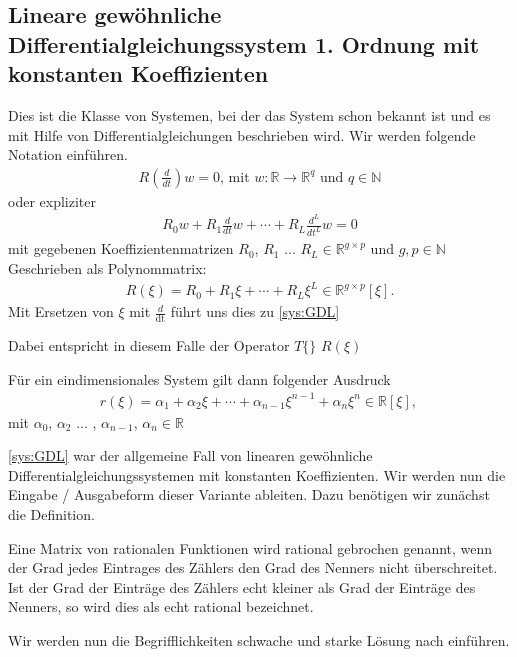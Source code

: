 \subsection{Lineare gewöhnliche Differentialgleichungssystem 1. Ordnung mit konstanten Koeffizienten}\label{sys:diff}
Dies ist die Klasse von Systemen, bei der das System schon bekannt ist und es mit Hilfe von Differentialgleichungen beschrieben wird. Wir werden folgende Notation einführen. 
\begin{align}
	R(\frac{d}{dt}) w = 0 \label{sys:GDL} \text{, mit } w: \mathbb{R} \rightarrow \mathbb{R}^q \text{ und }q \in \mathbb{N}
\end{align}
oder expliziter
\begin{align}
	R_0 w + R_1 \frac{d}{dt} w + \cdots + R_L \frac{d^L}{dt^L} w = 0
\end{align} 
mit gegebenen Koeffizientenmatrizen $R_0$, $R_1$ ... $R_L \in \mathbb{R}^{g \times p}$ und $g, p \in \mathbb{N}$
Geschrieben als Polynommatrix: 
\begin{align}
	R(\xi) = R_0  + R_1 \xi  + \cdots + R_L \xi^L \in \mathbb{R}^{g \times p}[\xi]\text{.}
\end{align}
Mit Ersetzen von $\xi$ mit $\frac{d}{\mathrm{dt}}$ führt uns dies zu \ref{sys:GDL}
\begin{bem}
Dabei entspricht in diesem Falle der Operator $T\{\}$ $R(\xi)$
\end{bem}
\begin{bem}
Für ein eindimensionales System gilt dann folgender Ausdruck
\begin{align}
	r(\xi) = \alpha_1  + \alpha_2 \xi  + \cdots +  \alpha_{n-1} \xi^{n-1} + \alpha_n \xi^n \in \mathbb{R}[\xi] \text{, }
\end{align}
mit $\alpha_0$, $\alpha_2$ ... , $\alpha_{n-1}$, $\alpha_n \in \mathbb{R}$
\end{bem}
\ref{sys:GDL} war der allgemeine Fall von linearen gewöhnliche Differentialgleichungssystemen mit konstanten Koeffizienten. Wir werden nun die Eingabe / Ausgabeform dieser Variante ableiten. Dazu benötigen wir zunächst die Definition.
\begin{defi}
Eine Matrix von rationalen Funktionen wird rational gebrochen genannt, wenn der Grad jedes Eintrages des Zählers den Grad des Nenners nicht überschreitet. Ist der Grad der Einträge des Zählers echt kleiner als Grad der Einträge des Nenners, so wird dies als echt rational bezeichnet. 
\end{defi}
Wir werden nun die Begrifflichkeiten schwache und starke Lösung nach \cite{Polderman1997} einführen.
